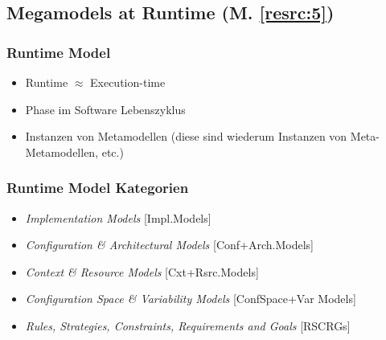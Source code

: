 
\subsection{Megamodels at Runtime (M. \ref{resrc:5})}
\subsubsection{Runtime Model}
\begin{itemize}

\item
Runtime $\approx$ Execution-time

\item
Phase im Software Lebenszyklus

\item
Instanzen von Metamodellen (diese sind wiederum Instanzen von Meta-Metamodellen, etc.)

\end{itemize}

\subsubsection{Runtime Model Kategorien}
\begin{itemize}

\item
\textit{Implementation Models} [Impl.Models]
\item
\textit{Configuration \& Architectural Models} [Conf+Arch.Models]
\item
\textit{Context \& Resource Models} [Cxt+Rsrc.Models]
\item
\textit{Configuration Space \& Variability Models} [ConfSpace+Var Models]
\item
\textit{Rules, Strategies, Constraints, Requirements and Goals} [RSCRGs]

\end{itemize}